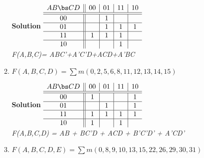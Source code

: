 \begin{enumerate}
\begin{enumerate}
\begin{onlysolution}  \textbf{Solution} \itshape{
$\begin{array} {c||c|c|c|c}
   A B \bs C D   & 00 & 01 & 11 & 10 \\ \hline \hline
       00        &    & 1  &    &    \\ \hline
       01        &    & 1  & 1  & 1  \\ \hline
       11        & 1  & 1  & 1  &    \\ \hline
       10        &    &    & 1  &    \\
\end{array}$  \\
F(A,B,C)= ABC'+A'C'D+ACD+A'BC
} \end{onlysolution} 
\item $F(A,B,C,D)=\sum m(0,2,5,6,8,11,12,13,14,15)$

\begin{onlysolution}  \textbf{Solution} \itshape{
$\begin{array} {c||c|c|c|c}
   A B \bs C D   & 00 & 01 & 11 & 10 \\ \hline \hline
       00        & 1  &    &    & 1  \\ \hline
       01        &    & 1  &    & 1  \\ \hline
       11        & 1  & 1  & 1  & 1  \\ \hline
       10        & 1  &    & 1  &    \\
\end{array}$  \\
F(A,B,C,D) =  AB + BC'D + ACD + B'C'D' + A'CD'
} \end{onlysolution} 
\item $F(A,B,C,D,E)=\sum m(0,8,9,10,13,15,22,26,29,30,31)$


\end{enumerate}
\end{enumerate}
